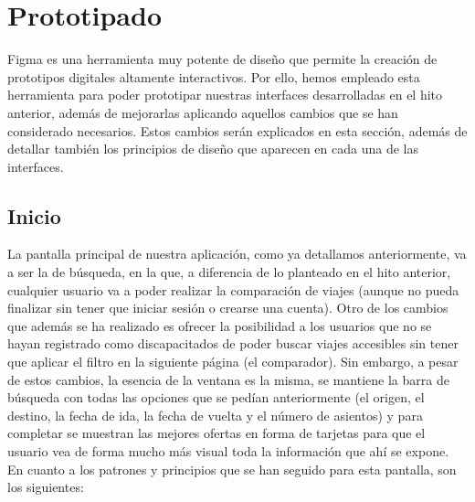 \section{Prototipado}

Figma es una herramienta muy potente de diseño que permite la creación de prototipos
digitales altamente interactivos. Por ello, hemos empleado esta herramienta para poder
prototipar nuestras interfaces desarrolladas en el hito anterior, además de mejorarlas
aplicando aquellos cambios que se han considerado necesarios. Estos cambios serán explicados
en esta sección, además de detallar también los principios de diseño que aparecen en cada
una de las interfaces.

\subsection*{Inicio}

La pantalla principal de nuestra aplicación, como ya detallamos anteriormente, va a ser la de búsqueda,
en la que, a diferencia de lo planteado en el hito anterior, cualquier usuario va a poder realizar la
comparación de viajes (aunque no pueda finalizar sin tener que iniciar sesión o crearse una cuenta). Otro
de los cambios que además se ha realizado es ofrecer la posibilidad a los usuarios que no se hayan registrado
como discapacitados de poder buscar viajes accesibles sin tener que aplicar el filtro en la siguiente página
(el comparador). Sin embargo, a pesar de estos cambios, la esencia de la ventana es la misma, se mantiene la
barra de búsqueda con todas las opciones que se pedían anteriormente (el origen, el destino, la fecha de ida,
la fecha de vuelta y el número de asientos) y para completar se muestran las mejores ofertas en forma de
tarjetas para que el usuario vea de forma mucho más visual toda la información que ahí se expone. En cuanto a
los patrones y principios que se han seguido para esta pantalla, son los siguientes:

